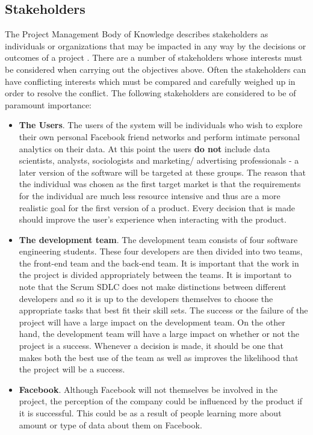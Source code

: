\documentclass[12pt,onecolumn]{article}
\begin{document}
	\subsection{Stakeholders} %
	
	The Project Management Body of Knowledge describes stakeholders as individuals or organizations that may be impacted in any way by the decisions or outcomes of a project \cite{pmbok}. There are a number of stakeholders whose interests must be considered when carrying out the objectives above. Often the stakeholders can have conflicting interests which must be compared and carefully weighed up in order to resolve the conflict. The following stakeholders are considered to be of paramount importance:
	
	\begin{itemize}
		\item \textbf{The Users}. The users of the system will be individuals who wish to explore their own personal Facebook friend networks and perform intimate personal analytics on their data. At this point the users \textbf{do not} include data scientists, analysts, sociologists and marketing/ advertising professionals - a later version of the software will be targeted at these groups. The reason that the individual was chosen as the first target market is that the requirements for the individual are much less resource intensive and thus are a more realistic goal for the first version of a product. Every decision that is made should improve the user's experience when interacting with the product. 
		
		\item \textbf{The development team}. The development team consists of four software engineering students. These four developers are then divided into two teams, the front-end team and the back-end team. It is important that the work in the project is divided appropriately between the teams. It is important to note that the Scrum SDLC does not make distinctions between different developers and so it is up to the developers themselves to choose the appropriate tasks that best fit their skill sets. The success or the failure of the project will have a large impact on the development team. On the other hand, the development team will have a large impact on whether or not the project is a success. Whenever a decision is made, it should be one that makes both the best use of the team as well as improves the likelihood that the project will be a success.
		
		\item \textbf{Facebook}. Although Facebook will not themselves be involved in the project, the perception of the company could be influenced by the product if it is successful. This could be as a result of people learning more about amount or type of data about them on Facebook.
		
	\end{itemize}
	
\end{document}
